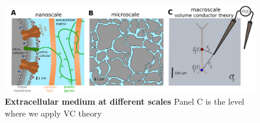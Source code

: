 \begin{figure}[!ht]
\begin{center}
\includegraphics[width=1.0\textwidth]{Figures/VC/ecs_scales_three_levels.png}
\end{center}
\caption{\textbf{Extracellular medium at different scales}
Panel C is the level where we apply VC theory
}
\label{fig:Basics:ECS_scales_3levels}
\end{figure}

\section{}
\label{sec:Basics:Current} 

